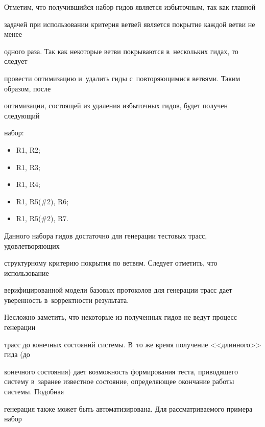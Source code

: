   Отметим, что получившийся набор гидов является избыточным, так как главной


задачей при использовании критерия ветвей является покрытие каждой ветви не менее


одного раза. Так как некоторые ветви покрываются в~нескольких гидах, то следует


провести оптимизацию и~удалить гиды с~повторяющимися ветвями. Таким образом, после


оптимизации, состоящей из удаления избыточных гидов, будет получен следующий


набор:


\begin{itemize}


\item    R1, R2;


\item


   R1, R3;


\item


   R1, R4;


\item


   R1, R5(\#2), R6;


\item


   R1, R5(\#2), R7.


   \end{itemize}





   Данного набора гидов достаточно для генерации тестовых трасс, удовлетворяющих


структурному критерию покрытия по ветвям. Следует отметить, что использование


верифицированной модели базовых протоколов для генерации трасс дает уверенность в~корректности результата.





   Несложно заметить, что некоторые из полученных гидов не ведут процесс генерации


трасс до конечных состояний системы. В~то же время получение <<длинного>> гида (до


конечного состояния) дает возможность формирования теста, приводящего систему в~заранее известное состояние, определяющее окончание работы системы. Подобная


генерация также может быть автоматизирована. Для рассматриваемого примера набор


